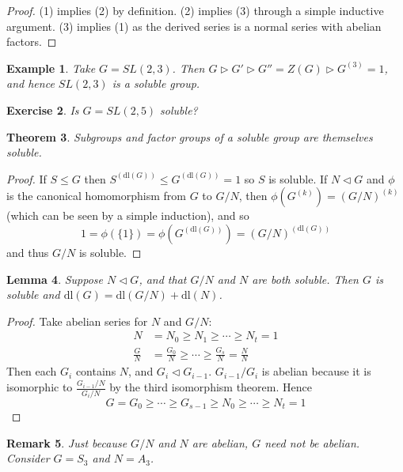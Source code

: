 \documentclass[a4paper,10pt]{article}
\newtheorem{thm}{Theorem}
\newtheorem{eg}[thm]{Example}
\newtheorem{Ex}[thm]{Exercise}
\newtheorem{Lem}[thm]{Lemma}
\newtheorem{rem}[thm]{Remark}
\begin{document}
\begin{proof}
(1) implies (2) by definition. (2) implies (3) through a simple inductive argument. (3) implies (1) as the derived series is a normal series with abelian factors. 
\end{proof}


\begin{eg}
Take $G = SL(2,3)$. Then $G \triangleright G' \triangleright G'' = Z(G) \triangleright G^{(3)} = 1$, and hence $SL(2,3)$ is a soluble group. 
\end{eg}

\begin{Ex}
Is $G = SL(2,5)$ soluble?
\end{Ex}

\begin{thm}
Subgroups and factor groups of a soluble group are themselves soluble.
\end{thm}

\begin{proof}
If $S \leq G$ then $S^{(\text{dl}(G))} \leq G^{(\text{dl}(G))} = 1$ so $S$ is soluble. If $N \triangleleft G$ and $\phi$ is the canonical homomorphism from $G$ to $G / N$, then $\phi(G^{(k)}) = (G / N)^{(k)}$ (which can be seen by a simple induction), and so 
\[ 1 = \phi(\{1\}) = \phi( G^{(\text{dl}(G))} ) = (G / N)^{(\text{dl}(G))} \]
and thus $G / N$ is soluble. 
\end{proof}


\begin{Lem}
Suppose $N \triangleleft G$, and that $G / N$ and $N$ are both soluble. Then $G$ is soluble and $\text{dl}(G) =  \text{dl}(G / N) + \text{dl}(N)$.
\end{Lem}

\begin{proof}
Take abelian series for $N$ and $G / N$: 
\begin{align*}
N &= N_0 \geq N_1 \geq \cdots \geq N_t = 1  \\
\frac{G}{N} &= \frac{G_0}{N} \geq \cdots \geq \frac{G_s}{N} = \frac{N}{N}
\end{align*}
Then each $G_i$ contains $N$, and $G_i \triangleleft G_{i-1}$. $G_{i-1} / G_i$ is abelian because it is isomorphic to $\frac{G_{i-1}/N}{G_i / N}$ by the third isomorphism theorem. Hence
\[ G = G_0 \geq \cdots \geq G_{s-1} \geq N_0 \geq \cdots \geq N_t = 1 \] 
\end{proof}


\begin{rem}
Just because $G/N$ and $N$ are abelian, $G$ need not be abelian. Consider $G = S_3$ and $N = A_3$.
\end{rem}
\end{document}
